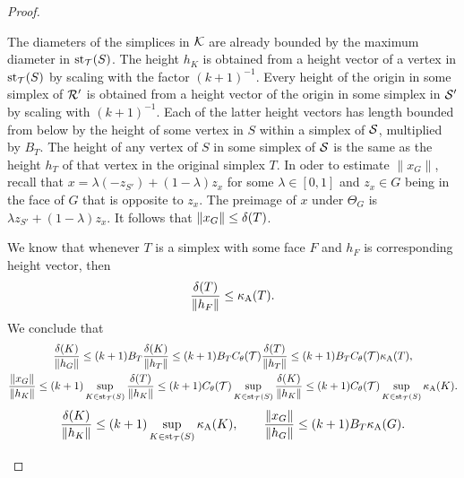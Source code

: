 \documentclass[10pt,letterpaper]{article}
\begin{document}
\begin{proof}
\begin{itemize}
        The diameters of the simplices in ${\mathcal K}$ are already bounded by the maximum diameter in $\operatorname{st}_{{\mathcal T}}(S)$.
        The height $h_{K}$ is obtained from a height vector of a vertex in $\operatorname{st}_{{\mathcal T}}(S)$ by scaling with the factor $(k+1)^{-1}$.
        Every height of the origin in some simplex of ${\mathcal R}'$ is obtained from a height vector of the origin in some simplex in ${\mathcal S}'$
        by scaling with $(k+1)^{-1}$. Each of the latter height vectors has length bounded from below by the height of some vertex in $S$ within a simplex of ${\mathcal S}$, multiplied by $B_{T}$. The height of any vertex of $S$ in some simplex of ${\mathcal S}$ is the same as the height $h_T$ of that vertex in the original simplex $T$. 
        In oder to estimate $\|x_{G}\|$, recall that $x = \lambda (-z_{S'}) + (1-\lambda) z_{x}$ for some $\lambda \in [0,1]$ and $z_{x} \in G$
        being in the face of $G$ that is opposite to $z_{x}$. The preimage of $x$ under $\Theta_{{G}}$ is $\lambda z_{S'} + (1-\lambda) z_{x}$. 
        It follows that $\|x_{G}\| \leq {\delta}(T)$. 
        
        We know that whenever $T$ is a simplex with some face $F$ and $h_F$ is corresponding height vector, then 
        \begin{align*}
            \frac{{\delta}(T)}{ \|h_{F}\|}
            \leq  
            \kappa_{\rm A}(T)
            .
        \end{align*}
        We conclude that 
        \begin{gather*}
            \frac{ \diam(K) }{ \| h_{{G}} \| }
            \leq 
            (k+1)B_{T}
            \frac{ \diam(K) }{ \| h_{T} \| }
            \leq 
            (k+1)B_{T}
            \diameterratio(\calT)
            \frac{ \diam(T) }{ \| h_{T} \| }
            \leq 
            (k+1)B_{T}
            \diameterratio(\calT)
            \aspectratio(T) %
            ,
            \\
            \frac{ \| x_{G} \| }{ \| h_{K} \| }
            \leq 
            (k+1)
            \sup_{ K \in \patch_{\calT}(S) }
            \frac{ \diam(T) }{ \| h_{K} \| }
            \leq 
            (k+1)
            \diameterratio(\calT)
            \sup_{ K \in \patch_{\calT}(S) }
            \frac{ \diam(K) }{ \| h_{K} \| }
            \leq 
            (k+1)
            \diameterratio(\calT)
            \sup_{ K \in \patch_{\calT}(S) }
            \aspectratio(K) %
            .
        \end{gather*}
        \begin{gather*}
            \frac{ \diam(K) }{ \| h_{{K}} \| }
            \leq 
            (k+1)
            \sup_{ K \in \patch_{\calT}(S) }
            \aspectratio(K) %
            ,
            \qquad 
            \frac{ \| x_{G} \| }{ \| h_{G} \| }
            \leq 
            (k+1)B_{T}
            \aspectratio({G}) %
            .
        \end{gather*}


\end{itemize}
\end{proof}
\end{document}
